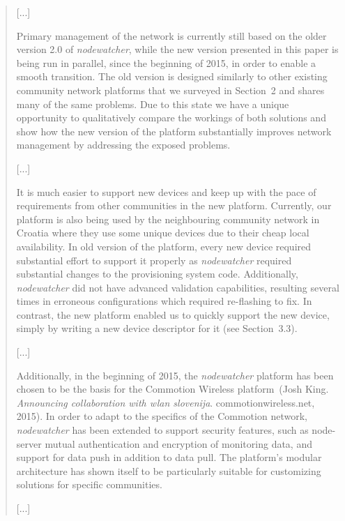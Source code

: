 \documentclass[12pt,twoside,a4paper]{report}
\newcommand{\nodewatcher}{\textit{nodewatcher}}
\begin{document}
\begin{quote}

[...]

Primary management of the network is currently still based on the older version 2.0 of \nodewatcher{}, while the new version presented in this paper is being run in parallel, since the beginning of 2015, in order to enable a smooth transition.
The old version is designed similarly to other existing community network platforms that we surveyed in Section~2 and shares many of the same problems.
Due to this state we have a unique opportunity to qualitatively compare the workings of both solutions and show how the new version of the platform substantially improves network management by addressing the exposed problems.

[...]

It is much easier to support new devices and keep up with the pace of requirements from other communities in the new platform.
Currently, our platform is also being used by the neighbouring community network in Croatia where they use some unique devices due to their cheap local availability.
In old version of the platform, every new device required substantial effort to support it properly as \nodewatcher{} required substantial changes to the provisioning system code.
Additionally, \nodewatcher{} did not have advanced validation capabilities, resulting several times in erroneous configurations which required re-flashing to fix.
In contrast, the new platform enabled us to quickly support the new device, simply by writing a new device descriptor for it (see Section~3.3).

[...]

Additionally, in the beginning of 2015, the \nodewatcher{} platform has been chosen to be the basis for the Commotion Wireless platform~(Josh King. \textit{Announcing collaboration with wlan slovenija}. commotionwireless.net, 2015).
In order to adapt to the specifics of the Commotion network, \nodewatcher{} has been extended to support security features, such as node-server mutual authentication and encryption of monitoring data, and support for data push in addition to data pull.
The platform's modular architecture has shown itself to be particularly suitable for customizing solutions for specific communities.

[...]

\end{quote}
\end{document}
